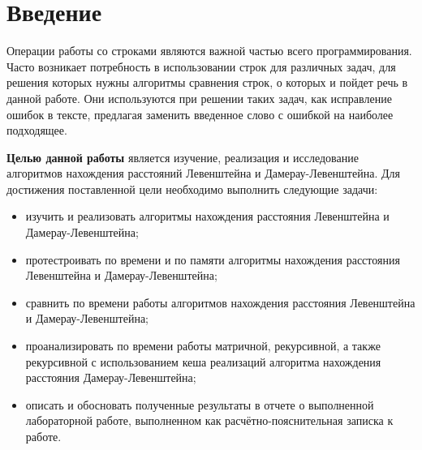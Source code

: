 \chapter*{Введение}

Операции работы со строками являются важной частью всего программирования. Часто возникает потребность в использовании строк для различных задач, для решения которых нужны алгоритмы сравнения строк, о которых и пойдет речь в данной работе.
Они используются при решении таких задач, как исправление ошибок в тексте, предлагая заменить введенное слово с ошибкой на наиболее подходящее.



\textbf{Целью данной работы} является изучение, реализация и исследование алгоритмов нахождения расстояний Левенштейна и Дамерау-Левенштейна.
Для достижения поставленной цели необходимо выполнить следующие задачи:
\begin{itemize}
	\item изучить и реализовать алгоритмы нахождения расстояния Левенштейна и Дамерау-Левенштейна;
    \item протестроивать по времени и по памяти алгоритмы нахождения расстояния Левенштейна и Дамерау-Левенштейна;
    \item сравнить по времени работы алгоритмов нахождения расстояния Левенштейна и Дамерау-Левенштейна;
    \item проанализировать по времени работы матричной, рекурсивной, а также рекурсивной с использованием кеша реализаций алгоритма нахождения расстояния Дамерау-Левенштейна;
	\item описать и обосновать полученные результаты в отчете о выполненной лабораторной работе, выполненном как расчётно-пояснительная записка к работе.
\end{itemize}
